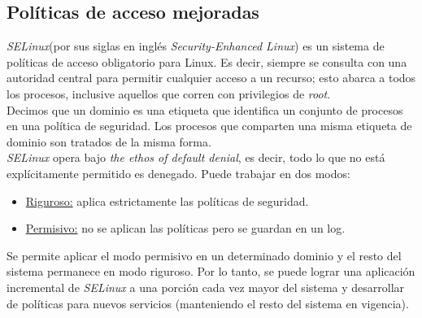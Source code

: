 \subsection{Pol\'iticas de acceso mejoradas}
\emph{SELinux}(por sus siglas en ingl\'es \textit{Security-Enhanced Linux}) es un sistema de políticas de acceso obligatorio para Linux. Es decir, siempre se consulta con una autoridad central para permitir cualquier acceso a un recurso; esto abarca a todos los procesos, inclusive aquellos que corren con privilegios de \textit{root}.\\
Decimos que un dominio es una etiqueta que identifica un conjunto de procesos en una política de seguridad. Los procesos que comparten una misma etiqueta de dominio son tratados de la misma forma. \\
\emph{SELinux} opera bajo \textit{the ethos of default denial}, es decir, todo lo que no está explícitamente permitido es denegado. Puede trabajar en dos modos:
\begin{itemize}
    \item \underline{Riguroso:} aplica estrictamente las políticas de seguridad.
    \item \underline{Permisivo:} no se aplican las políticas pero se guardan en un log.
\end{itemize} 
Se permite aplicar el modo permisivo en un determinado dominio y el resto del sistema permanece en modo riguroso. Por lo tanto, se puede lograr una aplicación incremental de \emph{SELinux} a una porción cada vez mayor del sistema y desarrollar de políticas para nuevos servicios (manteniendo el resto del sistema en vigencia).
